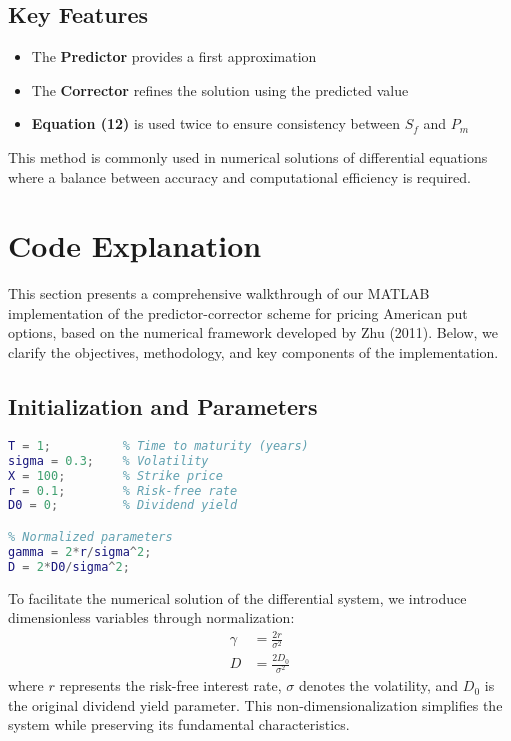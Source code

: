 \documentclass{article}
\begin{document}
\subsection*{Key Features}
\begin{itemize}
    \item The \textbf{Predictor} provides a first approximation
    \item The \textbf{Corrector} refines the solution using the predicted value
    \item \textbf{Equation (12)} is used twice to ensure consistency between $S_f$ and $P_m$
\end{itemize}

This method is commonly used in numerical solutions of differential equations where a balance between accuracy and computational efficiency is required.

\section{Code Explanation}
\label{sec:code}

This section presents a comprehensive walkthrough of our MATLAB implementation of the predictor-corrector scheme for pricing American put options, based on the numerical framework developed by Zhu (2011). Below, we clarify the objectives, methodology, and key components of the implementation.

\subsection{Initialization and Parameters}
\label{subsec:init}

\begin{lstlisting}[language=Matlab,caption={Parameter setup},label=code:params]
T = 1;          % Time to maturity (years)
sigma = 0.3;    % Volatility
X = 100;        % Strike price
r = 0.1;        % Risk-free rate
D0 = 0;         % Dividend yield

% Normalized parameters
gamma = 2*r/sigma^2;
D = 2*D0/sigma^2;
\end{lstlisting}
To facilitate the numerical solution of the differential system, we introduce dimensionless variables through normalization:
    \begin{align*}
        \gamma &= \frac{2r}{\sigma^2} \\
        D &= \frac{2D_0}{\sigma^2}
    \end{align*}
where $r$ represents the risk-free interest rate, $\sigma$ denotes the volatility, and $D_0$ is the original dividend yield parameter. This non-dimensionalization simplifies the system while preserving its fundamental characteristics.
\end{document}
